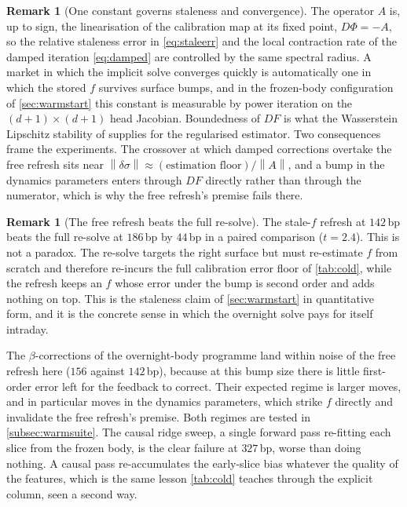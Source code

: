 \documentclass[11pt,a4paper]{article}
\theoremstyle{plain}
\theoremstyle{definition}
\theoremstyle{definition}
\newtheorem{remark}[theorem]{Remark}
\newcommand{\norm}[1]{\left\lVert #1 \right\rVert}
\newcommand{\Phimap}{\Phi}
\begin{document}
\begin{remark}[One constant governs staleness and convergence]\label{rem:stalespectral}
The operator $A$ is, up to sign, the linearisation of the calibration map at its fixed point, $D\Phimap = -A$, so the relative staleness error in \cref{eq:staleerr} and the local contraction rate of the damped iteration \cref{eq:damped} are controlled by the same spectral radius. A market in which the implicit solve converges quickly is automatically one in which the stored $f$ survives surface bumps, and in the frozen-body configuration of \cref{sec:warmstart} this constant is measurable by power iteration on the $(d+1)\times(d+1)$ head Jacobian. Boundedness of $DF$ is what the Wasserstein Lipschitz stability of \citet{bayer2022rkhs} supplies for the regularised estimator. Two consequences frame the experiments. The crossover at which damped corrections overtake the free refresh sits near $\norm{\delta\sigma} \approx (\text{estimation floor})/\norm{A}$, and a bump in the dynamics parameters enters through $DF$ directly rather than through the numerator, which is why the free refresh's premise fails there.
\end{remark}

\begin{remark}[The free refresh beats the full re-solve]\label{rem:jacobi}
The stale-$f$ refresh at $142$\,bp beats the full re-solve at $186$\,bp by $44$\,bp in a paired comparison ($t = 2.4$). This is not a paradox. The re-solve targets the right surface but must re-estimate $f$ from scratch and therefore re-incurs the full calibration error floor of \cref{tab:cold}, while the refresh keeps an $f$ whose error under the bump is second order and adds nothing on top. This is the staleness claim of \cref{sec:warmstart} in quantitative form, and it is the concrete sense in which the overnight solve pays for itself intraday.
\end{remark}

The $\beta$-corrections of the overnight-body programme land within noise of the free refresh here ($156$ against $142$\,bp), because at this bump size there is little first-order error left for the feedback to correct. Their expected regime is larger moves, and in particular moves in the dynamics parameters, which strike $f$ directly and invalidate the free refresh's premise. Both regimes are tested in \cref{subsec:warmsuite}. The causal ridge sweep, a single forward pass re-fitting each slice from the frozen body, is the clear failure at $327$\,bp, worse than doing nothing. A causal pass re-accumulates the early-slice bias whatever the quality of the features, which is the same lesson \cref{tab:cold} teaches through the explicit column, seen a second way.
\end{document}

